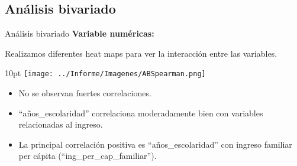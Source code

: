 \documentclass[pdf]{beamer}
\def\vspace{}%
\begin{document}
    \subsection{Análisis bivariado}

\begin{frame}{Análisis bivariado}
\textbf{Variable numéricas:}
    
    Realizamos diferentes heat maps para ver la interacción entre las variables.

    \begin{minipage}{0.5\textwidth}
        \vspace{10pt}
        \texttt{[image: ../Informe/Imagenes/ABSpearman.png]}
    \end{minipage}
    \begin{minipage}{0.46\textwidth}
        \begin{itemize}
            \justifying
            \item No se observan fuertes correlaciones.
            \item ``años\_escolaridad'' correlaciona moderadamente bien con variables relacionadas al ingreso.
            \item La principal correlación positiva es ``años\_escolaridad'' con ingreso familiar per cápita (``ing\_per\_cap\_familiar'').
        \end{itemize}
    \end{minipage}

\end{frame}
 

 

 
\end{document}
